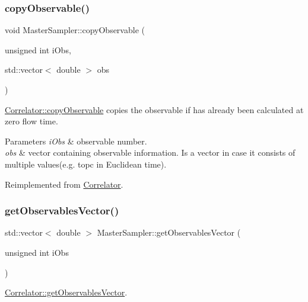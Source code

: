 \subsubsection{\texorpdfstring{copyObservable()}{copyObservable()}}
{\footnotesize\ttfamily void Master\+Sampler\+::copy\+Observable (\begin{DoxyParamCaption}\item[{unsigned int}]{i\+Obs,  }\item[{std\+::vector$<$ double $>$}]{obs }\end{DoxyParamCaption})\hspace{0.3cm}{\ttfamily [virtual]}}



\mbox{\hyperlink{class_correlator_ac780d8b180294ee4801ede6e6a13f7f4}{Correlator\+::copy\+Observable}} copies the observable if has already been calculated at zero flow time. 


\begin{DoxyParams}{Parameters}
{\em i\+Obs} & observable number. \\
\hline
{\em obs} & vector containing observable information. Is a vector in case it consists of multiple values(e.\+g. topc in Euclidean time). \\
\hline
\end{DoxyParams}


Reimplemented from \mbox{\hyperlink{class_correlator_ac780d8b180294ee4801ede6e6a13f7f4}{Correlator}}.

\mbox{\label{class_master_sampler_a471dffa3f29c68b4152b195708a9a5ac}} 
\subsubsection{\texorpdfstring{getObservablesVector()}{getObservablesVector()}}
{\footnotesize\ttfamily std\+::vector$<$ double $>$ Master\+Sampler\+::get\+Observables\+Vector (\begin{DoxyParamCaption}\item[{unsigned int}]{i\+Obs }\end{DoxyParamCaption})\hspace{0.3cm}{\ttfamily [virtual]}}



\mbox{\hyperlink{class_correlator_a7fb062b098beb078f3e546f4717b4941}{Correlator\+::get\+Observables\+Vector}}. 



